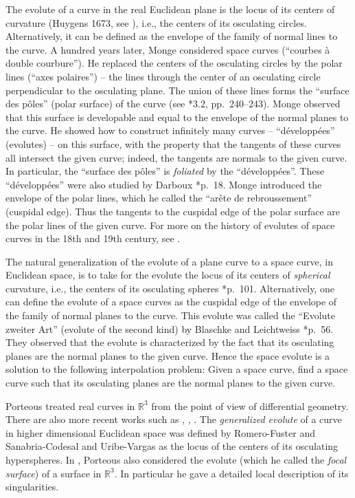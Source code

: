 \documentclass[reqno]{amsart}
\theoremstyle{definition}
\theoremstyle{remark}
\begin{document}
The evolute of a curve in the real Euclidean plane is the locus of its centers of curvature (Huygens 1673, see \cite{Huy}), i.e., the centers of its osculating circles. Alternatively, it can be defined as the envelope of the family of normal lines to the curve. 
A hundred years later, Monge \cite{Monge} considered space curves (``courbes \`a double courbure''). He replaced the centers of the osculating  circles by the  polar lines (``axes polaires'') -- the lines through the center of an osculating circle perpendicular to the osculating plane. The union of these lines forms the ``surface des p\^oles'' (polar surface) of the curve (see \cite{Del}*{3.2, pp.~240--243}). Monge observed that this surface is developable and equal to the envelope of the normal planes to the curve. He showed how to construct infinitely many curves -- ``d\'evelopp\'ees'' (evolutes) -- on this surface, with the property that the tangents of these curves all intersect the given curve; indeed, the tangents are normals to the given curve. In particular, the ``surface des p\^oles''  is \emph{foliated} by the ``d\'evelopp\'ees''. 
These  ``d\'evelopp\'ees'' were also studied by Darboux  \cite{Darb}*{p.~18}.
Monge introduced the envelope of the polar lines, which he called the ``ar\^ete de rebroussement'' (cuspidal edge). Thus the tangents to the cuspidal edge of the polar surface are the polar lines of the given curve.
For more on the history of evolutes of space curves in the 18th and 19th century, see \cite{Del}.


The natural generalization of the evolute of a plane curve to a space curve, in Euclidean space, is to take for the evolute
 the locus of its centers of \emph{spherical} curvature, i.e., the centers of its osculating spheres \cite{P1}*{p.~101}. 
Alternatively, one can define the evolute of a space curves as the cuspidal edge of the envelope of the family of normal planes to the curve. This evolute was called the ``Evolute zweiter Art'' (evolute of the second kind) by Blaschke and Leichtweiss \cite{BL}*{p.~56}. They observed that the evolute is characterized by the fact that its osculating planes are the normal planes to the given curve. Hence the space evolute is a solution to the following interpolation problem: Given a space curve, find a space curve such that its osculating planes are the normal planes to the given curve.
 
Porteous \cite{P1} treated real curves in $\mathbb R^3$ from the point of view of  differential geometry. There are also more recent works such as \cites{Fuchs}, \cite{FT}, \cite{FIRST}.
The \emph{generalized evolute} of a curve in higher dimensional Euclidean space was defined by Romero-Fuster and Sanabria-Codesal \cite{Romero} and Uribe-Vargas \cite{UV} as the locus of the centers of its osculating hyperspheres. 
In  \cite{P1}, Porteous also considered the evolute (which he called the \emph{focal surface}) of a surface in $\mathbb R^3$. In particular he gave a detailed  local description of its singularities. 
\end{document}
